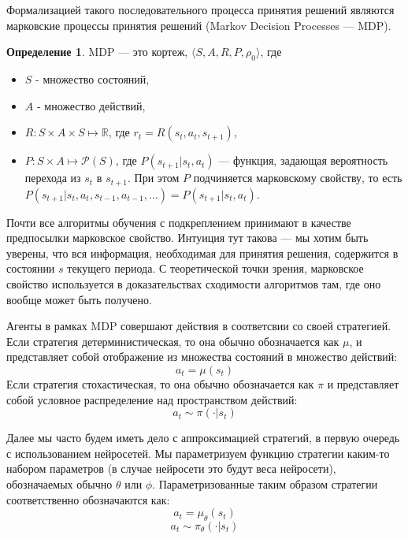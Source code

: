 \documentclass[12pt, a4paper]{extarticle}
\theoremstyle{definition}
\newtheorem{definition}{Определение}[section]
\begin{document}
Формализацией такого последовательного процесса принятия решений являются марковские процессы принятия решений (Markov Decision Processes --- MDP). 
\begin{definition}
MDP --- это кортеж, $\langle S, A, R, P, \rho_{0} \rangle$, где \begin{itemize}
    \item $S$ - множество состояний,
    \item $A$ - множество действий,
    \item $R: S \times A \times S \mapsto \mathbb{R}$, где $r_{t} = R(s_{t},a_t,s_{t+1})$,
    \item \label{markov} $P: S\times A \mapsto \mathcal{P}(S)$, где $P(s_{t+1}|s_{t}, a_t)$ --- функция, задающая вероятность перехода из $s_t$ в $s_{t+1}$. При этом $P$ подчиняется марковскому свойству, то есть $P(s_{t+1}|s_{t}, a_t, s_{t-1}, a_{t-1}, \ldots) = P(s_{t+1}|s_{t}, a_t)$.
\end{itemize}
\end{definition}

Почти все алгоритмы обучения с подкреплением принимают в качестве предпосылки марковское свойство. Интуиция тут такова --- мы хотим быть уверены, что вся информация, необходимая для принятия решения, содержится в состоянии $s$ текущего периода. С теоретической точки зрения, марковское свойство используется в доказательствах сходимости алгоритмов там, где оно вообще может быть получено. 

Агенты в рамках MDP совершают действия в соответсвии со своей стратегией. Если стратегия детерминистическая, то она обычно обозначается как $\mu$, и представляет собой отображение из множества состояний в множество действий:
\begin{equation} \label{mu}
    a_t = \mu(s_t)
\end{equation}
Если стратегия стохастическая, то она обычно обозначается как $\pi$ и представляет собой условное распределение над пространством действий:
\begin{equation}
a_t\sim \pi(\cdot| s_t)
\end{equation}

Далее мы часто будем иметь дело с аппроксимацией стратегий, в первую очередь с использованием нейросетей. Мы параметризуем функцию стратегии каким-то набором параметров (в случае нейросети это будут веса нейросети), обозначаемых обычно $\theta$ или $\phi$. Параметризованные таким образом стратегии соответственно обозначаются как:
\begin{equation}
    a_t = \mu_{\theta}(s_t) 
    \end{equation}
\begin{equation}
    a_t \sim \pi_{\theta}(\cdot|s_t)
    \end{equation}
    
\end{document}
